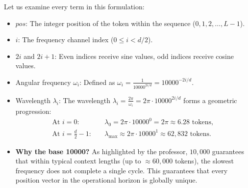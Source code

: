 \documentclass[../../main.tex]{subfiles}
\begin{document}
Let us examine every term in this formulation:
\begin{itemize}
    \item $pos$: The integer position of the token within the sequence ($0, 1, 2, \dots, L-1$).
    \item $i$: The frequency channel index ($0 \le i < d/2$).
    \item $2i$ and $2i+1$: Even indices receive sine values, odd indices receive cosine values.
    \item Angular frequency $\omega_i$: Defined as $\omega_i = \frac{1}{10000^{2i / d}} = 10000^{-2i/d}$.
    \item Wavelength $\lambda_i$: The wavelength $\lambda_i = \frac{2\pi}{\omega_i} = 2\pi \cdot 10000^{2i / d}$ forms a geometric progression:
    \begin{align}
    \text{At } i = 0: \quad &\lambda_0 = 2\pi \cdot 10000^0 = 2\pi \approx 6.28 \text{ tokens}, \\
    \text{At } i = \frac{d}{2} - 1: \quad &\lambda_{\max} \approx 2\pi \cdot 10000^1 \approx 62{,}832 \text{ tokens}.
    \end{align}
    \item \textbf{Why the base 10000?} As highlighted by the professor, $10{,}000$ guarantees that within typical context lengths (up to $\approx 60{,}000$ tokens), the slowest frequency does not complete a single cycle. This guarantees that every position vector in the operational horizon is globally unique.
\end{itemize}
\end{document}
